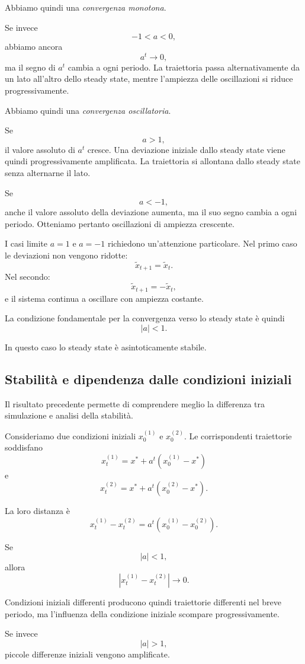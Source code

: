 \documentclass{book}
\begin{document}
Abbiamo quindi una \emph{convergenza monotona}.

Se invece
\[
-1<a<0,
\]
abbiamo ancora
\[
a^t\rightarrow0,
\]
ma il segno di $a^t$ cambia a ogni periodo. La traiettoria passa
alternativamente da un lato all'altro dello steady state, mentre
l'ampiezza delle oscillazioni si riduce progressivamente.

Abbiamo quindi una \emph{convergenza oscillatoria}.

Se
\[
a>1,
\]
il valore assoluto di $a^t$ cresce. Una deviazione iniziale dallo
steady state viene quindi progressivamente amplificata. La traiettoria
si allontana dallo steady state senza alternarne il lato.

Se
\[
a<-1,
\]
anche il valore assoluto della deviazione aumenta, ma il suo segno
cambia a ogni periodo. Otteniamo pertanto oscillazioni di ampiezza
crescente.

I casi limite $a=1$ e $a=-1$ richiedono un'attenzione particolare.
Nel primo caso le deviazioni non vengono ridotte:
\[
\widetilde{x}_{t+1}=\widetilde{x}_t.
\]
Nel secondo:
\[
\widetilde{x}_{t+1}=-\widetilde{x}_t,
\]
e il sistema continua a oscillare con ampiezza costante.

La condizione fondamentale per la convergenza verso lo steady state è
quindi
\[
|a|<1.
\]

In questo caso lo steady state è asintoticamente stabile.


\subsection{Stabilità e dipendenza dalle condizioni iniziali}

Il risultato precedente permette di comprendere meglio la differenza
tra simulazione e analisi della stabilità.

Consideriamo due condizioni iniziali $x_0^{(1)}$ e $x_0^{(2)}$. Le
corrispondenti traiettorie soddisfano
\[
x_t^{(1)}
=
x^*+a^t(x_0^{(1)}-x^*)
\]
e
\[
x_t^{(2)}
=
x^*+a^t(x_0^{(2)}-x^*).
\]

La loro distanza è
\[
x_t^{(1)}-x_t^{(2)}
=
a^t\left(x_0^{(1)}-x_0^{(2)}\right).
\]

Se
\[
|a|<1,
\]
allora
\[
\left|x_t^{(1)}-x_t^{(2)}\right|
\rightarrow0.
\]

Condizioni iniziali differenti producono quindi traiettorie differenti
nel breve periodo, ma l'influenza della condizione iniziale scompare
progressivamente.

Se invece
\[
|a|>1,
\]
piccole differenze iniziali vengono amplificate.
\end{document}
